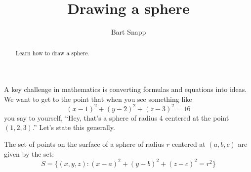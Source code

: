 \documentclass{ximera}
\author{Bart Snapp}
\title[Dig-In:]{Drawing a sphere}
\begin{document}
\begin{abstract}
 Learn how to draw a sphere.
\end{abstract}
\maketitle

A key challenge in mathematics is converting formulas and equations
into ideas. We want to get to the point that when you see something
like
\[
(x-1)^2+(y-2)^2+(z-3)^2=16
\]
you say to yourself, ``Hey, that's a sphere of radius $4$ centered at
the point $(1,2,3)$.'' Let's state this generally.
\begin{theorem}
  The set of points on the surface of a sphere of radius $r$ centered
  at $(a,b,c)$ are given by the set:
  \[
  S = \{(x,y,z):(x-a)^2+(y-b)^2+(z-c)^2=r^2\}
  \]
\end{theorem}
\end{document}
